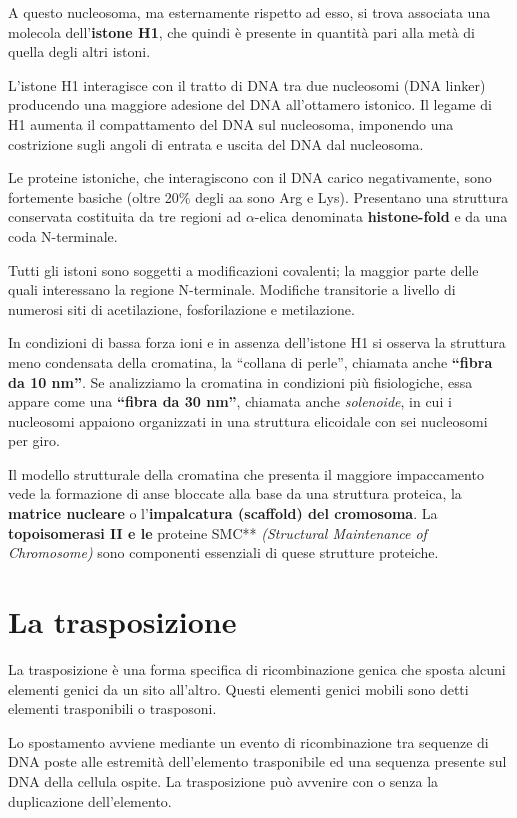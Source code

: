 \documentclass[11pt]{book}
\begin{document}
A questo nucleosoma, ma esternamente rispetto ad esso, si trova
associata una molecola dell'\textbf{istone H1}, che quindi è presente in
quantità pari alla metà di quella degli altri istoni.

L'istone H1 interagisce con il tratto di DNA tra due nucleosomi (DNA
linker) producendo una maggiore adesione del DNA all'ottamero istonico.
Il legame di H1 aumenta il compattamento del DNA sul nucleosoma,
imponendo una costrizione sugli angoli di entrata e uscita del DNA dal
nucleosoma.

Le proteine istoniche, che interagiscono con il DNA carico
negativamente, sono fortemente basiche (oltre 20\% degli aa sono Arg e
Lys). Presentano una struttura conservata costituita da tre regioni ad
\(\alpha\)-elica denominata \textbf{histone-fold} e da una coda
N-terminale.

Tutti gli istoni sono soggetti a modificazioni covalenti; la maggior
parte delle quali interessano la regione N-terminale. Modifiche
transitorie a livello di numerosi siti di acetilazione, fosforilazione e
metilazione.

In condizioni di bassa forza ioni e in assenza dell'istone H1 si osserva
la struttura meno condensata della cromatina, la ``collana di perle'',
chiamata anche \textbf{``fibra da 10 nm''}. Se analizziamo la cromatina
in condizioni più fisiologiche, essa appare come una \textbf{``fibra da
30 nm''}, chiamata anche \emph{solenoide}, in cui i nucleosomi appaiono
organizzati in una struttura elicoidale con sei nucleosomi per giro.

Il modello strutturale della cromatina che presenta il maggiore
impaccamento vede la formazione di anse bloccate alla base da una
struttura proteica, la \textbf{matrice nucleare} o l'\textbf{impalcatura
(scaffold) del cromosoma}. La \textbf{topoisomerasi II e le }proteine
SMC** \emph{(Structural Maintenance of Chromosome)} sono componenti
essenziali di quese strutture proteiche.

\chapter{La trasposizione}\label{la-trasposizione}

La trasposizione è una forma specifica di ricombinazione genica che
sposta alcuni elementi genici da un sito all'altro. Questi elementi
genici mobili sono detti elementi trasponibili o trasposoni.

Lo spostamento avviene mediante un evento di ricombinazione tra sequenze
di DNA poste alle estremità dell'elemento trasponibile ed una sequenza
presente sul DNA della cellula ospite. La trasposizione può avvenire con
o senza la duplicazione dell'elemento.
\end{document}
